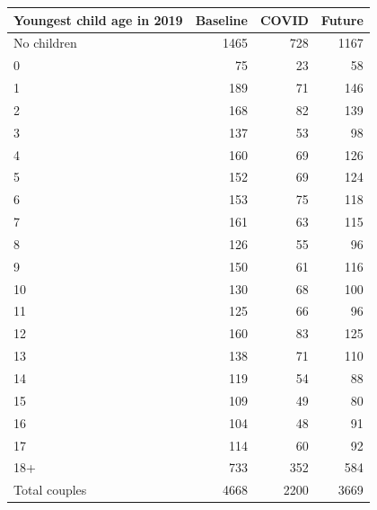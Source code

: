 
\begin{tabular}{lrrr}
\toprule
Youngest child age in 2019 & Baseline & COVID & Future\\
\midrule
No children & 1465 & 728 & 1167\\
0 & 75 & 23 & 58\\
1 & 189 & 71 & 146\\
2 & 168 & 82 & 139\\
3 & 137 & 53 & 98\\
4 & 160 & 69 & 126\\
5 & 152 & 69 & 124\\
6 & 153 & 75 & 118\\
7 & 161 & 63 & 115\\
8 & 126 & 55 & 96\\
9 & 150 & 61 & 116\\
10 & 130 & 68 & 100\\
11 & 125 & 66 & 96\\
12 & 160 & 83 & 125\\
13 & 138 & 71 & 110\\
14 & 119 & 54 & 88\\
15 & 109 & 49 & 80\\
16 & 104 & 48 & 91\\
17 & 114 & 60 & 92\\
18+ & 733 & 352 & 584\\
Total couples & 4668 & 2200 & 3669\\
\bottomrule
\end{tabular}
